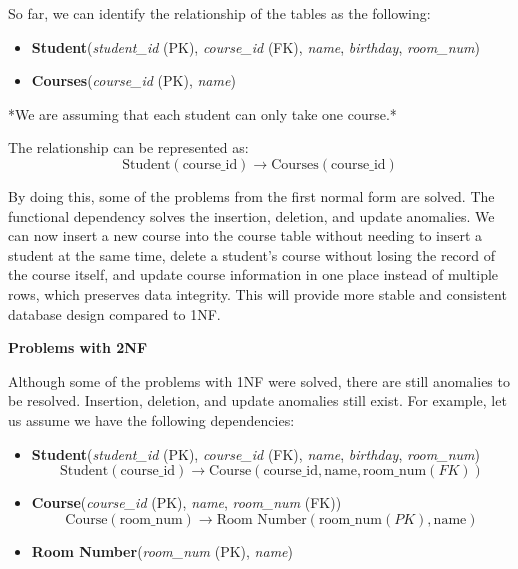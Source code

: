 So far, we can identify the relationship of the tables as the following:

\begin{itemize}
    \item \textbf{Student}(\textit{student\_id} (PK), \textit{course\_id} (FK), \textit{name}, \textit{birthday}, \textit{room\_num}) 
    \item \textbf{Courses}(\textit{course\_id} (PK), \textit{name})
\end{itemize}

\noindent
*We are assuming that each student can only take one course.*

\noindent
The relationship can be represented as:
\[
\text{Student}(\text{course\_id}) \rightarrow \text{Courses}(\text{course\_id})
\]

By doing this, some of the problems from the first normal form are solved. 
The functional dependency solves the insertion, deletion, and update anomalies.
We can now insert a new course into the course table without needing to insert a student at the same time, 
delete a student’s course without losing the record of the course itself, and update course information in one place instead of multiple rows, 
which preserves data integrity. This will provide more stable and consistent database design compared to 1NF.

\textbf{Problems with 2NF}

Although some of the problems with 1NF were solved, there are still anomalies to be resolved. Insertion, deletion, and update anomalies still exist. For example, let us assume we have the following dependencies:

\begin{itemize}
    \item \textbf{Student}(\textit{student\_id} (PK), \textit{course\_id} (FK), \textit{name}, \textit{birthday}, \textit{room\_num}) 
    \[
    \text{Student}(\text{course\_id}) \rightarrow \text{Course}(\text{course\_id}, \text{name}, \text{room\_num} (FK))
    \]
    
    \item \textbf{Course}(\textit{course\_id} (PK), \textit{name}, \textit{room\_num} (FK)) 
    \[
    \text{Course}(\text{room\_num}) \rightarrow \text{Room Number}(\text{room\_num} (PK), \text{name})
    \]
    
    \item \textbf{Room Number}(\textit{room\_num} (PK), \textit{name})
\end{itemize}

